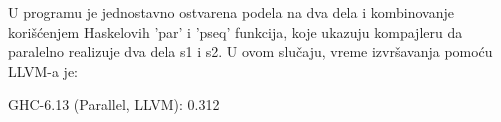 U programu je jednostavno ostvarena podela na dva dela i kombinovanje korišćenjem Haskelovih 'par' i 'pseq' funkcija, koje ukazuju kompajleru da paralelno realizuje dva dela s1 i s2. U ovom slučaju, vreme izvršavanja pomoću LLVM-a je:

GHC-6.13 (Parallel, LLVM): 0.312


